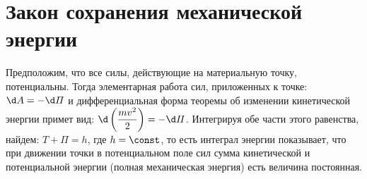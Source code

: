 \section{Закон сохранения механической энергии}

Предположим, что все силы, действующие на материальную точку, потенциальны.
Тогда элементарная работа сил, приложенных к точке: \( \d A = -\d\varPi \) и
дифференциальная форма теоремы об изменении кинетической энергии примет вид:
\( \ds \d\left(\frac{mv^2}{2}\right) = -\d\varPi \). Интегрируя обе части этого
равенства, найдем: \( T + \varPi = h \), где \( h = \const \), то есть интеграл
энергии показывает, что при движении точки в потенциальном поле сил сумма
кинетической и потенциальной энергии (полная механическая энергия) есть величина
постоянная.

\newpage
